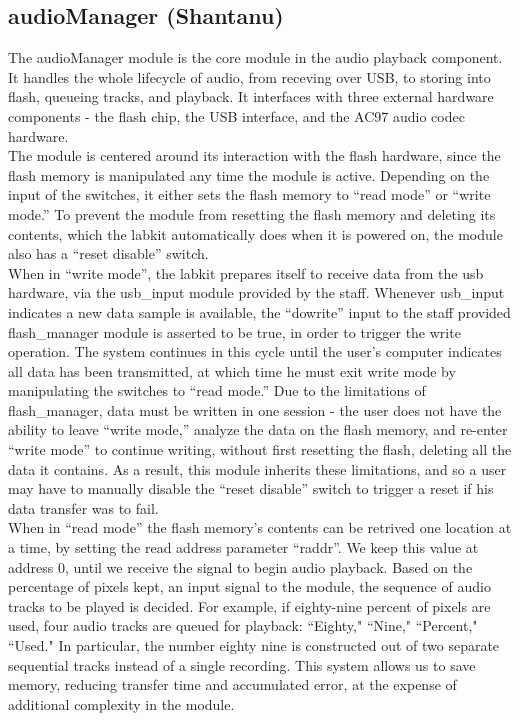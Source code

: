 \documentclass{article}
\begin{document}
\subsection{audioManager (Shantanu)}
The audioManager module is the core module in the audio playback component. It handles the whole lifecycle of audio, from receving over USB, to storing into flash, queueing tracks, and playback. It interfaces with three external hardware components - the flash chip, the USB interface, and the AC97 audio codec hardware.\\
The module is centered around its interaction with the flash hardware, since the flash memory is manipulated any time the module is active. Depending on the input of the switches, it either sets the flash memory to ``read mode''  or ``write mode.'' To prevent the module from resetting the flash memory and deleting its contents, which the labkit automatically does when it is powered on, the module also has a ``reset disable'' switch.\\
When in ``write mode'', the labkit prepares itself to receive data from the usb hardware, via the usb\_input module provided by the staff. Whenever usb\_input indicates a new data sample is available, the ``dowrite'' input to the staff provided flash\_manager module is asserted to be true, in order to trigger the write operation. The system continues in this cycle until the user's computer indicates all data has been transmitted, at which time he must exit write mode by manipulating the switches to ``read mode.'' Due to the limitations of flash\_manager, data must be written in one session - the user does not have the ability to leave ``write mode,'' analyze the data on the flash memory, and re-enter ``write mode'' to continue writing, without first resetting the flash, deleting all the data it contains. As a result, this module inherits these limitations, and so a user may have to manually disable the ``reset disable'' switch to trigger a reset if his data transfer was to fail. \\
When in ``read mode'' the flash memory's contents can be retrived one location at a time, by setting the read address parameter ``raddr''. We keep this value at address 0, until we receive the signal to begin audio playback. Based on the percentage of pixels kept, an input signal to the module, the sequence of audio tracks to be played is decided. For example, if eighty-nine percent of pixels are used, four audio tracks are queued for playback: ``Eighty," ``Nine," ``Percent," ``Used." In particular, the number eighty nine is constructed out of two separate sequential tracks instead of a single recording. This system allows us to save memory, reducing transfer time and accumulated error, at the expense of additional complexity in the module.\\
\end{document}
